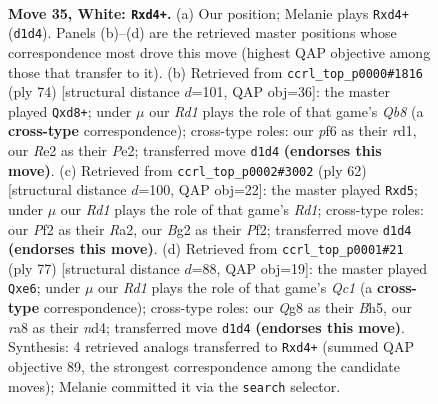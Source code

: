 \documentclass[11pt]{article}
\begin{document}
\clearpage

\begin{figure}[p]\centering
\begin{subfigure}{0.46\textwidth}\centering
\resizebox{\linewidth}{!}{%
\newchessgame
\chessboard[
  setfen={r2n2Q1/1p1k2p1/p4pN1/6np/3q4/4P1P1/PP2RPBP/3R2K1 w - - 6 35},
  showmover=false,
  pgfstyle=straightmove, color=movearrow, markmove={d1-d4}
]}
\caption{}
\end{subfigure}\hfill
\begin{subfigure}{0.46\textwidth}\centering
\resizebox{\linewidth}{!}{%
\newchessgame
\chessboard[
  setfen={1Q1q1k2/6p1/1p2p3/p1n4p/P1R2P1P/5NP1/4PK2/3r4 w - - 10 38},
  showmover=false,
  pgfstyle=straightmove, color=movearrow, markmove={b8-d8}
]}
\caption{}
\end{subfigure}
\\[4pt]
\begin{subfigure}{0.46\textwidth}\centering
\resizebox{\linewidth}{!}{%
\newchessgame
\chessboard[
  setfen={1r2r1k1/6p1/p4p1p/3q4/PPp1n3/4P1P1/R4PBP/3R2K1 w - - 0 32},
  showmover=false,
  pgfstyle=straightmove, color=movearrow, markmove={d1-d5}
]}
\caption{}
\end{subfigure}\hfill
\begin{subfigure}{0.46\textwidth}\centering
\resizebox{\linewidth}{!}{%
\newchessgame
\chessboard[
  setfen={2q5/p1r3pk/4Qp1p/P2p3b/3N4/4PP1P/6P1/3R2K1 b - - 6 39},
  showmover=false,
  pgfstyle=straightmove, color=movearrow, markmove={c8-e6}
]}
\caption{}
\end{subfigure}
\caption{\textbf{Move 35, White: \texttt{Rxd4+}.} (a) Our position; Melanie plays \texttt{Rxd4+} (\texttt{d1d4}). Panels (b)--(d) are the retrieved master positions whose correspondence most drove this move (highest QAP objective among those that transfer to it). (b) Retrieved from \texttt{ccrl\_top\_p0000\#1816} (ply 74) [structural distance $d$=101, QAP obj=36]: the master played \texttt{Qxd8+}; under $\mu$ our \emph{Rd1} plays the role of that game's \emph{Qb8} (a \textbf{cross-type} correspondence); cross-type roles: our \emph{p}f6 as their \emph{r}d1, our \emph{R}e2 as their \emph{P}e2; transferred move \texttt{d1d4} \textbf{(endorses this move)}. (c) Retrieved from \texttt{ccrl\_top\_p0002\#3002} (ply 62) [structural distance $d$=100, QAP obj=22]: the master played \texttt{Rxd5}; under $\mu$ our \emph{Rd1} plays the role of that game's \emph{Rd1}; cross-type roles: our \emph{P}f2 as their \emph{R}a2, our \emph{B}g2 as their \emph{P}f2; transferred move \texttt{d1d4} \textbf{(endorses this move)}. (d) Retrieved from \texttt{ccrl\_top\_p0001\#21} (ply 77) [structural distance $d$=88, QAP obj=19]: the master played \texttt{Qxe6}; under $\mu$ our \emph{Rd1} plays the role of that game's \emph{Qc1} (a \textbf{cross-type} correspondence); cross-type roles: our \emph{Q}g8 as their \emph{B}h5, our \emph{r}a8 as their \emph{n}d4; transferred move \texttt{d1d4} \textbf{(endorses this move)}. Synthesis: 4 retrieved analogs transferred to \texttt{Rxd4+} (summed QAP objective 89, the strongest correspondence among the candidate moves); Melanie committed it via the \texttt{search} selector.}
\label{fig:thought-m68}
\end{figure}
\end{document}
